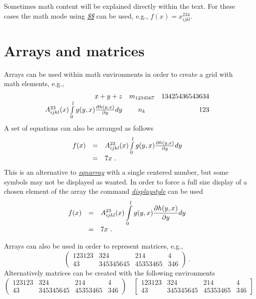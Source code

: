 \documentclass[a4paper]{book}
\newcommand{\imp}[1]{\underline{\textit{#1}}}
\begin{document}
Sometimes math content will be explained directly within the text. For these cases the math mode using \imp{\$\$} can be used, e.g., $f(x) = x^{234}_{ijkl}$.


\section{Arrays and matrices}

Arrays can be used within math environments in order to create a grid with math elements, e.g.,
\begin{equation}
	\begin{array}{rcr}
	x + y + z 
		& m_{1234567} 
		& 13425436543634 \\
	A^{23}_{ijkl}(x) \int_0^l\limits g(y,x) \frac{\partial h(y,x)}{\partial y} d y 
		& n_{k} 
		& 123
	\end{array}
\end{equation}
A set of equations can also be arranged as follows
\begin{equation}
	\begin{array}{rcl}
	f(x)
	&=& A^{23}_{ijkl}(x) \int_0^l\limits g(y,x) \frac{\partial h(y,x)}{\partial y} d y \\
	&=& 7 x \ .
	\end{array}
\end{equation}
This is an alternative to \imp{eqnarray} with a single centered number, but some symbols may not be displayed as wanted. In order to force a full size display of a chosen element of the array the command \imp{displaystyle} can be used
\begin{equation}
	\begin{array}{rcl}
	f(x)
	&=& \displaystyle A^{23}_{ijkl}(x) \int_0^l\limits g(y,x) \frac{\partial h(y,x)}{\partial y} d y \\
	&=& 7 x \ .
	\end{array}
\end{equation} 

Arrays can also be used in order to represent matrices, e.g., 
\begin{equation}
	\left(
	\begin{array}{cccc}
	123123 & 324 & 214 & 4 \\
	43& 345345645 & 45353465 & 346
	\end{array}
	\right) \ .
\end{equation}
Alternatively matrices can be created with the following environments
\begin{equation}
	\begin{pmatrix}
	123123 & 324 & 214 & 4 \\
	43& 345345645 & 45353465 & 346
	\end{pmatrix} 
	\quad
	\begin{bmatrix}
	123123 & 324 & 214 & 4 \\
	43& 345345645 & 45353465 & 346
	\end{bmatrix}
\end{equation}
\end{document}
